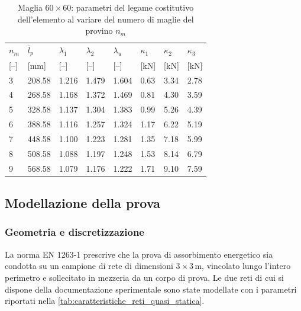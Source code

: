 \begin{table}[htbp]
    \centering
    \caption{Maglia $60\times60$: parametri del legame costitutivo dell'elemento al variare del numero di maglie del provino $n_m$}
    \vspace{5pt}
    \label{tab:famiglia_60}
    \begin{tabularx}{\textwidth}{*{8}{Y}}
        \hline
        \rule{0pt}{3ex}
        $n_m$ & $\bar{l}_p$ & $\lambda_1$ & $\lambda_2$ & $\lambda_u$ & $\kappa_1$ & $\kappa_2$ & $\kappa_3$ \\
        {[--]} & [mm] & [--] & [--] & [--] & [kN] & [kN] & [kN] \\ \hline
        \rule{0pt}{3ex}
        3 & 208.58 & 1.216 & 1.479 & 1.604 & 0.63 & 3.34 & 2.78 \\
        4 & 268.58 & 1.168 & 1.372 & 1.469 & 0.81 & 4.30 & 3.59 \\
        5 & 328.58 & 1.137 & 1.304 & 1.383 & 0.99 & 5.26 & 4.39 \\
        6 & 388.58 & 1.116 & 1.257 & 1.324 & 1.17 & 6.22 & 5.19 \\
        7 & 448.58 & 1.100 & 1.223 & 1.281 & 1.35 & 7.18 & 5.99 \\
        8 & 508.58 & 1.088 & 1.197 & 1.248 & 1.53 & 8.14 & 6.79 \\
        9 & 568.58 & 1.079 & 1.176 & 1.222 & 1.71 & 9.10 & 7.59 \\[3pt] \hline
    \end{tabularx}
\end{table}

\FloatBarrier
\subsection{Modellazione della prova}
\label{sec:modellazione_prova}

\subsubsection{Geometria e discretizzazione}
\label{sec:geometria_prova}

La norma EN 1263-1 \cite{EN1263-1} prescrive che la prova di assorbimento energetico sia condotta su un campione di rete di dimensioni $3\times3\,\text{m}$, vincolato lungo l'intero perimetro e sollecitato in mezzeria da un corpo di prova. Le due reti di cui si dispone della documentazione sperimentale sono state modellate con i parametri riportati nella \cref{tab:caratteristiche_reti_quasi_statica}.

